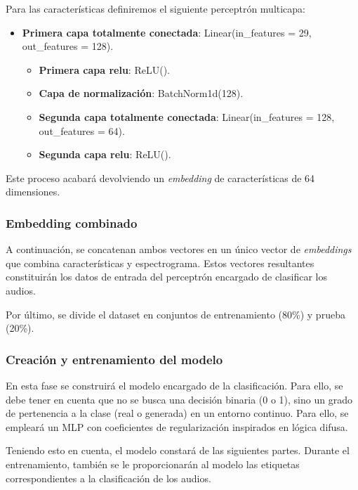 Para las características definiremos el siguiente perceptrón multicapa:

\begin{itemize}
	\item \textbf{Primera capa totalmente conectada}: Linear(in\_features = 29, out\_features = 128). 
	  \begin{itemize}
	 	\item \textbf{Primera capa relu}: ReLU().
	 	\item \textbf{Capa de normalización}: BatchNorm1d(128).
	 	\item \textbf{Segunda capa totalmente conectada}: Linear(in\_features = 128, out\_features = 64).
	 	\item \textbf{Segunda capa relu}: ReLU().
	   \end{itemize}
\end{itemize}

Este proceso acabará devolviendo un \textit{embedding} de características de 64 dimensiones.

\subsubsection*{Embedding combinado}

A continuación, se concatenan ambos vectores en un único vector de \textit{embeddings} que combina características y espectrograma. Estos vectores resultantes constituirán los datos de entrada del perceptrón encargado de clasificar los audios.

Por último, se divide el dataset en conjuntos de entrenamiento (80\%) y prueba (20\%).

\subsubsection*{Creación y entrenamiento del modelo}

En esta fase se construirá el modelo encargado de la clasificación. Para ello, se debe tener en cuenta que no se busca una decisión binaria (0 o 1), sino un grado de pertenencia a la clase (real o generada) en un entorno continuo. Para ello, se empleará un MLP con coeficientes de regularización inspirados en lógica difusa.

Teniendo esto en cuenta, el modelo constará de las siguientes partes. Durante el entrenamiento, también se le proporcionarán al modelo las etiquetas correspondientes a la clasificación de los audios.

